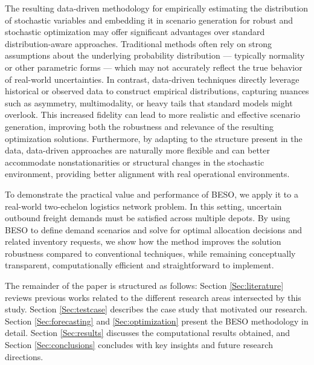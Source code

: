\documentclass[poms,final,nonblindrev]{poms1_V1} %
\begin{document}
The resulting data-driven methodology for empirically estimating the distribution of stochastic variables and embedding it in scenario generation for robust and stochastic optimization may offer significant advantages over standard distribution-aware approaches. Traditional methods often rely on strong assumptions about the underlying probability distribution — typically normality or other parametric forms — which may not accurately reflect the true behavior of real-world uncertainties. In contrast, data-driven techniques directly leverage historical or observed data to construct empirical distributions, capturing nuances such as asymmetry, multimodality, or heavy tails that standard models might overlook. This increased fidelity can lead to more realistic and effective scenario generation, improving both the robustness and relevance of the resulting optimization solutions. Furthermore, by adapting to the structure present in the data, data-driven approaches are naturally more flexible and can better accommodate nonstationarities or structural changes in the stochastic environment, providing better alignment with real operational environments.


To demonstrate the practical value and performance of BESO, we apply it to a real-world two-echelon logistics network problem. In this setting, uncertain outbound freight demands must be satisfied across multiple depots. By using BESO to define demand scenarios and solve for optimal allocation decisions and related inventory requests, we show how the method improves the solution robustness compared to conventional techniques, while remaining conceptually transparent, computationally efficient and straightforward to implement.

The remainder of the paper is structured as follows: Section \ref{Sec:literature} reviews previous works related to the different research areas intersected by this study. Section \ref{Sec:testcase} describes the case study that motivated our research. Section \ref{Sec:forecasting} and \ref{Sec:optimization} present the BESO methodology in detail.  Section \ref{Sec:results} discusses the computational results obtained, and Section \ref{Sec:conclusions} concludes with key insights and future research directions.
\end{document}
